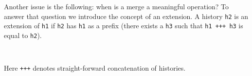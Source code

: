 Another issue is the following: when is a merge a meaningful operation?
To answer that question we introduce the concept of an extension. A history
\texttt{h2} is an extension of \texttt{h1} if \texttt{h2} has \texttt{h1} as
a prefix (there exists a \texttt{h3} such that \texttt{h1 +++ h3} is equal to \texttt{h2}).
\begin{code}%
\>[0]\AgdaSpace{}%
\AgdaSymbol{:}\AgdaSpace{}%
\AgdaSymbol{\{}\AgdaSpace{}%
\AgdaSpace{}%
\AgdaSymbol{:}\AgdaSpace{}%
\AgdaSymbol{\}}\AgdaSpace{}%
\AgdaSpace{}%
\AgdaSpace{}%
\AgdaSpace{}%
\AgdaSpace{}%
\AgdaSpace{}%
\AgdaSpace{}%
\AgdaSpace{}%
\AgdaSpace{}%
\AgdaSpace{}%
\<%
\\
\>[0]\AgdaSpace{}%
\AgdaSymbol{\{}\AgdaSymbol{\}}\AgdaSpace{}%
\AgdaSymbol{\{}\AgdaSymbol{\}}\AgdaSpace{}%
\AgdaSpace{}%
\AgdaSpace{}%
\AgdaSymbol{=}\AgdaSpace{}%
\AgdaFunction{Σ[}\AgdaSpace{}%
\AgdaSpace{}%
\AgdaSpace{}%
\AgdaSpace{}%
\AgdaSpace{}%
\AgdaSpace{}%
\AgdaFunction{]}\AgdaSpace{}%
\AgdaSymbol{(}\AgdaSpace{}%
\AgdaOperator{\AgdaFunction{+++}}\AgdaSpace{}%
\AgdaSymbol{)}\AgdaSpace{}%
\AgdaSpace{}%
\<%
\end{code}
Here \texttt{+++} denotes straight-forward concatenation of histories.

